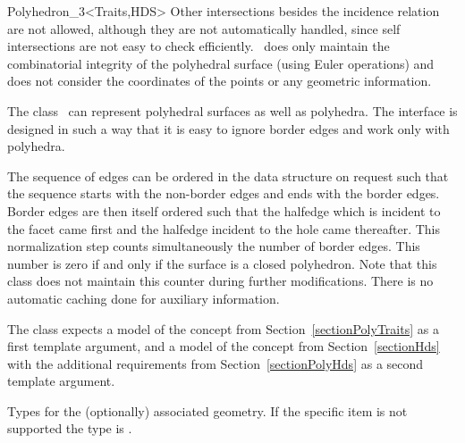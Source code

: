 \begin{ccClassTemplate}{Polyhedron_3<Traits,HDS>}
Other intersections besides the incidence relation are not allowed,
although they are not automatically handled, since self intersections
are not easy to check efficiently. \ccClassTemplateName\ does only
maintain the combinatorial integrity of the polyhedral surface (using
Euler operations) and does not consider the coordinates of the points
or any geometric information.

The class \ccClassTemplateName\ can represent polyhedral surfaces as
well as polyhedra. The interface is designed in such a way that it
is easy to ignore border edges and work only with polyhedra.

The sequence of edges can be ordered in the data structure on request
such that the sequence starts with the non-border edges and ends with
the border edges. Border edges are then itself ordered such that the
halfedge which is incident to the facet came first and the halfedge
incident to the hole came thereafter. This normalization step counts
simultaneously the number of border edges. This number is zero if and
only if the surface is a closed polyhedron. Note that this class does
not maintain this counter during further modifications. There is no
automatic caching done for auxiliary information.

The class  expects a model of the
 concept from Section~\ref{sectionPolyTraits}
as a first template argument, and a model of the
 concept from Section~\ref{sectionHds}
with the additional requirements from Section~\ref{sectionPolyHds} as a second
template argument.



\ccTypes


\ccGlue
{}
\ccGlue
{}
\ccGlue
{}
\ccGlue
{}
\ccGlue
{}
\ccGlue
{}

Types for the (optionally) associated geometry. If
the specific item is not supported the type is .


\end{ccClassTemplate}
